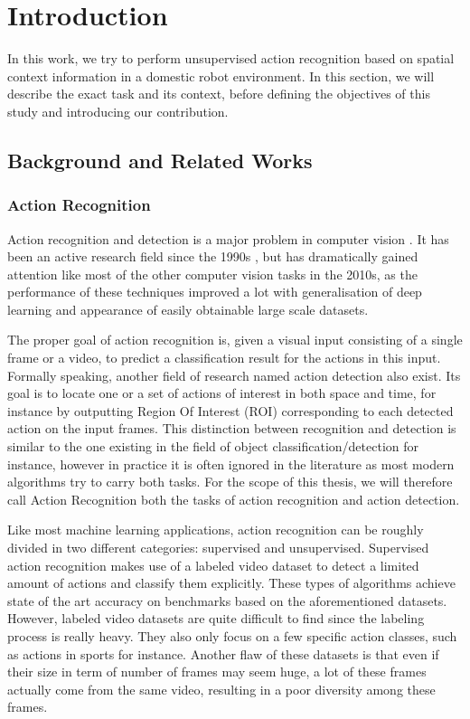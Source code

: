 \chapter{Introduction}

In this work, we try to perform unsupervised action recognition based on spatial context information in a domestic robot environment. In this section, we will describe the exact task and its context, before defining the objectives of this study and introducing our contribution.

\section{Background and Related Works}
\subsection{Action Recognition}
Action recognition and detection is a major problem in computer vision \cite{review_action_recognition}. It has been an active research field since the 1990s \cite{plan_recognition}, but has dramatically gained attention like most of the other computer vision tasks in the 2010s, as the performance of these techniques improved a lot with generalisation of deep learning and appearance of easily obtainable large scale datasets.

The proper goal of action recognition is, given a visual input consisting of a single frame or a video, to predict a classification result for the actions in this input. Formally speaking, another field of research named action detection also exist. Its goal is to locate one or a set of actions of interest in both space and time, for instance by outputting Region Of Interest (ROI) corresponding to each detected action on the input frames.
This distinction between recognition and detection is similar to the one existing in the field of object classification/detection for instance, however in practice it is often ignored in the literature as most modern algorithms try to carry both tasks. For the scope of this thesis, we will therefore call Action Recognition both the tasks of action recognition and action detection.

Like most machine learning applications, action recognition can be roughly divided in two different categories: supervised and unsupervised. Supervised action recognition makes use of a labeled video dataset \cite{hollywood2,sports_video_dataset,ActivityNet} to detect a limited amount of actions and classify them explicitly. These types of algorithms achieve state of the art accuracy on benchmarks based on the aforementioned datasets. However, labeled video datasets are quite difficult to find since the labeling process is really heavy. They also only focus on a few specific action classes, such as actions in sports for instance. Another flaw of these datasets is that even if their size in term of number of frames may seem huge, a lot of these frames actually come from the same video, resulting in a poor diversity among these frames.


